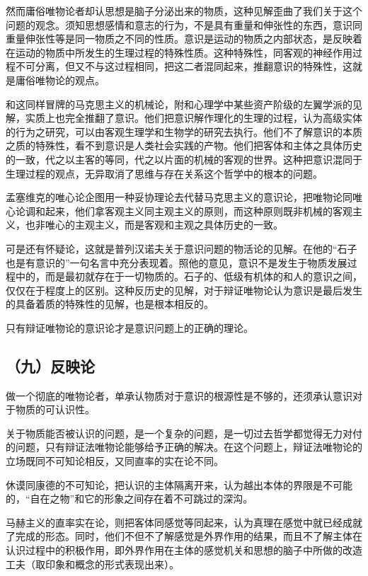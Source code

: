 然而庸俗唯物论者却认思想是脑子分泌出来的物质，这种见解歪曲了我们关于这个问题的观念。须知思想感情和意志的行为，不是具有重量和伸张性的东西，意识同重量伸张性等是同一物质之不同的性质。意识是运动的物质之内部状态，是反映着在运动的物质中所发生的生理过程的特殊性质。这种特殊性，同客观的神经作用过程不可分离，但又不与这过程相同，把这二者混同起来，推翻意识的特殊性，这就是庸俗唯物论的观点。

和这同样冒牌的马克思主义的机械论，附和心理学中某些资产阶级的左翼学派的见解，实质上也完全推翻了意识。他们把意识解作理化的生理的过程，认为高级实体的行为之研究，可以由客观生理学和生物学的研究去执行。他们不了解意识的本质之质的特殊性，看不到意识是人类社会实践的产物。他们把客体和主体之具体历史的一致，代之以主客的等同，代之以片面的机械的客观的世界。这种把意识混同于生理过程的观点，无异取消了思维与存在关系这个哲学中的根本的问题。

孟塞维克的唯心论企图用一种妥协理论去代替马克思主义的意识论，把唯物论同唯心论调和起来，他们拿客观主义同主观主义的原则，而这种原则既非机械的客观主义，也非唯心的主观主义，而是客观和主观之具体历史的一致。

可是还有怀疑论，这就是普列汉诺夫关于意识问题的物活论的见解。在他的“石子也是有意识的”一句名言中充分表现着。照他的意见，意识不是发生于物质发展过程中的，而是最初就存在于一切物质的。石子的、低级有机体的和人的意识之间，仅仅在于程度上的区别。这种反历史的见解，对于辩证唯物论认为意识是最后发生的具备着质的特殊性的见解，也是根本相反的。

只有辩证唯物论的意识论才是意识问题上的正确的理论。

\subsection{（九）反映论}

做一个彻底的唯物论者，单承认物质对于意识的根源性是不够的，还须承认意识对于物质的可认识性。

关于物质能否被认识的问题，是一个复杂的问题，是一切过去哲学都觉得无力对付的问题，只有辩证法唯物论能够给予正确的解决。在这个问题上，辩证法唯物论的立场既同不可知论相反，又同直率的实在论不同。

休谟同康德的不可知论，把认识的主体隔离开来，认为越出本体的界限是不可能的，“自在之物”和它的形象之间存在着不可跳过的深沟。

马赫主义的直率实在论，则把客体同感觉等同起来，认为真理在感觉中就已经成就了完成的形态。同时，他们不但不了解感觉是外界作用的结果，而且不了解主体在认识过程中的积极作用，即外界作用在主体的感觉机关和思想的脑子中所做的改造工夫（取印象和概念的形式表现出来）。

